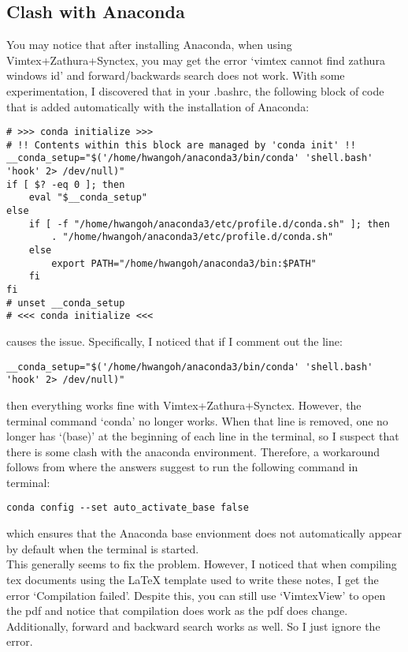 \subsection{Clash with Anaconda}
You may notice that after installing Anaconda, when using
Vimtex+Zathura+Synctex, you may get the error `vimtex cannot find zathura
windows id' and forward/backwards search does not work. With some
experimentation, I discovered that in your .bashrc, the following block of code
that is added automatically with the installation of Anaconda:
\begin{lstlisting}
# >>> conda initialize >>>
# !! Contents within this block are managed by 'conda init' !!
__conda_setup="$('/home/hwangoh/anaconda3/bin/conda' 'shell.bash' 'hook' 2> /dev/null)"
if [ $? -eq 0 ]; then
    eval "$__conda_setup"
else
    if [ -f "/home/hwangoh/anaconda3/etc/profile.d/conda.sh" ]; then
        . "/home/hwangoh/anaconda3/etc/profile.d/conda.sh"
    else
        export PATH="/home/hwangoh/anaconda3/bin:$PATH"
    fi
fi
# unset __conda_setup
# <<< conda initialize <<<
\end{lstlisting}
causes the issue. Specifically, I noticed that if I comment out the line:
\begin{lstlisting}
__conda_setup="$('/home/hwangoh/anaconda3/bin/conda' 'shell.bash' 'hook' 2> /dev/null)"
\end{lstlisting}
then everything works fine with Vimtex+Zathura+Synctex. However, the terminal
command `conda' no longer works. When that line is removed, one no longer has
`(base)' at the beginning of each line in the terminal, so I suspect that there
is some clash with the anaconda environment. Therefore, a workaround follows
from \cite{drylabrebel2019how} where the answers suggest to run the
following command in terminal:
\begin{lstlisting}
conda config --set auto_activate_base false
\end{lstlisting}
which ensures that the Anaconda base envionment does not automatically appear by
default when the terminal is started.\\

This generally seems to fix the problem. However, I noticed that when compiling
tex documents using the LaTeX template used to write these notes, I get the
error `Compilation failed'. Despite this, you can still use `VimtexView' to open the
pdf and notice that compilation does work as the pdf does change. Additionally,
forward and backward search works as well. So I just ignore the error.

